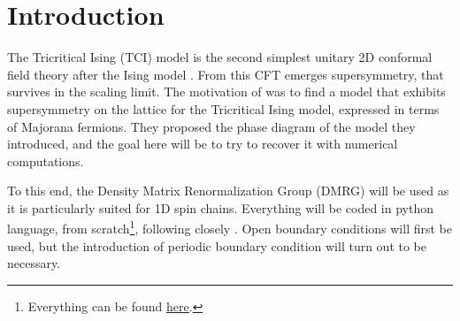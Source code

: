\section{Introduction}

	The Tricritical Ising (TCI) model is the second simplest unitary 2D conformal field theory after the Ising model \cite{belavin1984, francesco1997, friedan1984, cardy1986}. From this CFT emerges supersymmetry, that survives in the scaling limit. The motivation of \cite{obrien2018} was to find a model that exhibits supersymmetry on the lattice for the Tricritical Ising model, expressed in terms of Majorana fermions. They proposed the phase diagram of the model they introduced, and the goal here will be to try to recover it with numerical computations.

	To this end, the Density Matrix Renormalization Group (DMRG) will be used as it is particularly suited for 1D spin chains. Everything will be coded in python language, from scratch\footnote{Everything can be found \href{https://github.com/anthony-rey/DMRG}{here}.}, following closely \cite{schollwoeck2011}. Open boundary conditions will first be used, but the introduction of periodic boundary condition will turn out to be necessary.

